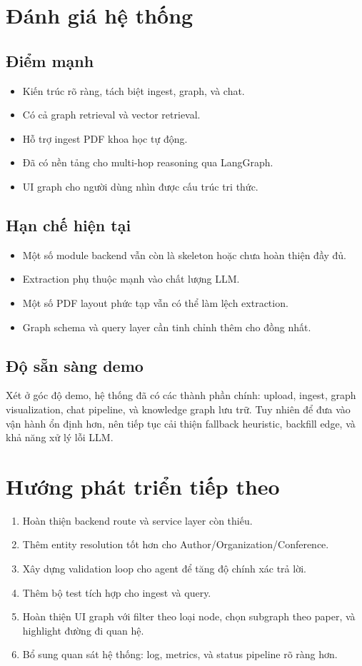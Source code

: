 \documentclass[12pt,a4paper]{article}
\begin{document}
\section{Đánh giá hệ thống}
\subsection{Điểm mạnh}
\begin{itemize}[leftmargin=1.6em]
  \item Kiến trúc rõ ràng, tách biệt ingest, graph, và chat.
  \item Có cả graph retrieval và vector retrieval.
  \item Hỗ trợ ingest PDF khoa học tự động.
  \item Đã có nền tảng cho multi-hop reasoning qua LangGraph.
  \item UI graph cho người dùng nhìn được cấu trúc tri thức.
\end{itemize}

\subsection{Hạn chế hiện tại}
\begin{itemize}[leftmargin=1.6em]
  \item Một số module backend vẫn còn là skeleton hoặc chưa hoàn thiện đầy đủ.
  \item Extraction phụ thuộc mạnh vào chất lượng LLM.
  \item Một số PDF layout phức tạp vẫn có thể làm lệch extraction.
  \item Graph schema và query layer cần tinh chỉnh thêm cho đồng nhất.
\end{itemize}

\subsection{Độ sẵn sàng demo}
Xét ở góc độ demo, hệ thống đã có các thành phần chính: upload, ingest, graph visualization, chat pipeline, và knowledge graph lưu trữ. Tuy nhiên để đưa vào vận hành ổn định hơn, nên tiếp tục cải thiện fallback heuristic, backfill edge, và khả năng xử lý lỗi LLM.

\section{Hướng phát triển tiếp theo}
\begin{enumerate}[leftmargin=1.6em]
  \item Hoàn thiện backend route và service layer còn thiếu.
  \item Thêm entity resolution tốt hơn cho Author/Organization/Conference.
  \item Xây dựng validation loop cho agent để tăng độ chính xác trả lời.
  \item Thêm bộ test tích hợp cho ingest và query.
  \item Hoàn thiện UI graph với filter theo loại node, chọn subgraph theo paper, và highlight đường đi quan hệ.
  \item Bổ sung quan sát hệ thống: log, metrics, và status pipeline rõ ràng hơn.
\end{enumerate}
\end{document}
